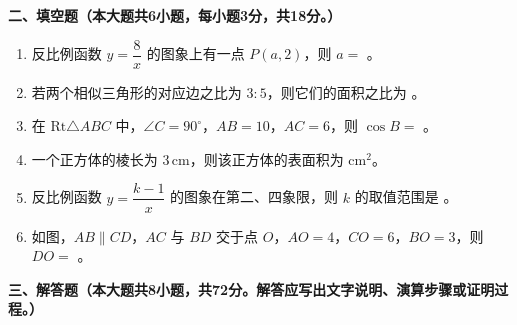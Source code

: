 \documentclass[12pt, a4paper]{ctexart}
\begin{document}
\vspace{0.5em}

\noindent\textbf{二、填空题（本大题共6小题，每小题3分，共18分。）}

\begin{enumerate}[label=\arabic*., start=11]

\item 反比例函数 $y = \dfrac{8}{x}$ 的图象上有一点 $P(a, 2)$，则 $a =$ \underline{\hspace{3cm}}。

\item 若两个相似三角形的对应边之比为 $3 : 5$，则它们的面积之比为 \underline{\hspace{3cm}}。

\item 在 $\text{Rt}\triangle ABC$ 中，$\angle C = 90^\circ$，$AB = 10$，$AC = 6$，则 $\cos B =$ \underline{\hspace{3cm}}。

\item 一个正方体的棱长为 $3\,\text{cm}$，则该正方体的表面积为 \underline{\hspace{3cm}} $\text{cm}^2$。

\item 反比例函数 $y = \dfrac{k-1}{x}$ 的图象在第二、四象限，则 $k$ 的取值范围是 \underline{\hspace{3cm}}。

\item 如图，$AB \parallel CD$，$AC$ 与 $BD$ 交于点 $O$，$AO = 4$，$CO = 6$，$BO = 3$，则 $DO =$ \underline{\hspace{3cm}}。

\end{enumerate}

\vspace{0.5em}

\noindent\textbf{三、解答题（本大题共8小题，共72分。解答应写出文字说明、演算步骤或证明过程。）}
\end{document}
